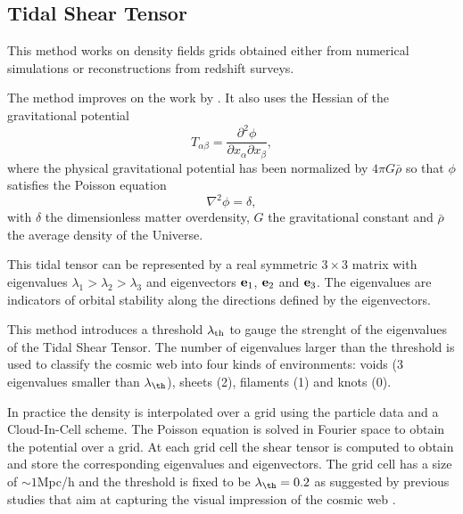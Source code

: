 \subsection{Tidal Shear Tensor}
\label{section:forero-romero}

This method \cite{2009MNRAS.396.1815F} works on density fields grids
obtained either from numerical simulations or reconstructions from
redshift surveys. 

The method improves on the work by \citep{2007MNRAS.375..489H}. It
also uses the Hessian of the gravitational potential 
\begin{equation}
T_{\alpha\beta} = \frac{\partial^2\phi}{\partial x_\alpha\partial x_\beta},
\end{equation}
%
where the physical gravitational potential has been normalized by
$4\pi G\bar{\rho}$ so that $\phi$ satisfies the Poisson
equation
\begin{equation}
\nabla^2\phi=\delta,
\end{equation}
%
with $\delta$ the dimensionless matter overdensity, $G$ the
gravitational constant and $\bar{\rho}$ the average density of the
Universe.

This tidal tensor can be represented by a real symmetric $3\times 3$
matrix with eigenvalues $\lambda_1>\lambda_2>\lambda_3$ and
eigenvectors ${\bf e}_1$, ${\bf e}_2$ and ${\bf e}_3$. The eigenvalues
are indicators of orbital stability along the directions defined by
the eigenvectors. 

This method introduces a threshold $\lambda_{\rm th}$ to gauge the
strenght of the eigenvalues of the Tidal Shear Tensor. The number of
eigenvalues larger than the threshold is used to classify the cosmic
web into four kinds of environments: voids (3 eigenvalues smaller than
$\lambda_{\th}$), sheets (2), filaments (1) and knots (0).

In practice the density is interpolated over a grid using the particle
data and a Cloud-In-Cell scheme. The Poisson equation is solved in
Fourier space to obtain the potential over a grid. At each grid cell
the shear tensor is computed to obtain and store the corresponding
eigenvalues and eigenvectors. The grid cell has a size of $\sim
1$Mpc/h and the threshold is fixed to be $\lambda_{\th}=0.2$ as
suggested by previous studies that aim at capturing the visual
impression of the cosmic web \cite{2009MNRAS.396.1815F}. 







